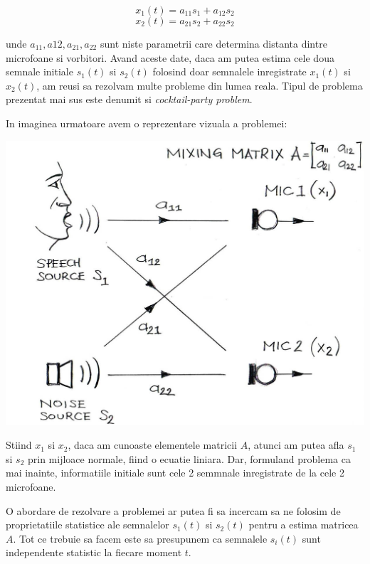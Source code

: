 \documentclass[12pt]{article}
\begin{document}
\begin{equation}
	x_1(t)=a_{11} s_1 + a_{12} s_2
\end{equation}
\begin{equation}
	x_2(t)=a_{21} s_2 + a_{22} s_2
\end{equation}

unde $a_{11}, a{12}, a_{21}, a_{22}$ sunt niste parametrii care determina distanta dintre microfoane si vorbitori. Avand aceste date, daca am putea estima cele doua semnale initiale $s_1(t)$ si $s_2(t)$ folosind doar semnalele inregistrate $x_1(t)$ si $x_2(t)$, am reusi sa rezolvam multe probleme din lumea reala. Tipul de problema prezentat mai sus este denumit si \textit{cocktail-party problem}.
\newpage

In imaginea urmatoare avem o reprezentare vizuala a problemei:

\begin{center}
	\includegraphics[scale=0.4]{two-sound-sources}
\end{center}


Stiind $x_1$ si $x_2$, daca am cunoaste elementele matricii $A$, atunci am putea afla $s_1$ si $s_2$ prin mijloace normale, fiind o ecuatie liniara. Dar, formuland problema ca mai inainte, informatiile initiale sunt cele 2 semmnale inregistrate de la cele 2 microfoane.

O abordare de rezolvare a problemei ar putea fi sa incercam sa ne folosim de proprietatiile statistice ale semnalelor $s_1(t)$ si $s_2(t)$ pentru a estima matricea $A$. Tot ce trebuie sa facem este sa presupunem ca semnalele $s_i(t)$ sunt independente statistic la fiecare moment $t$.
\end{document}
